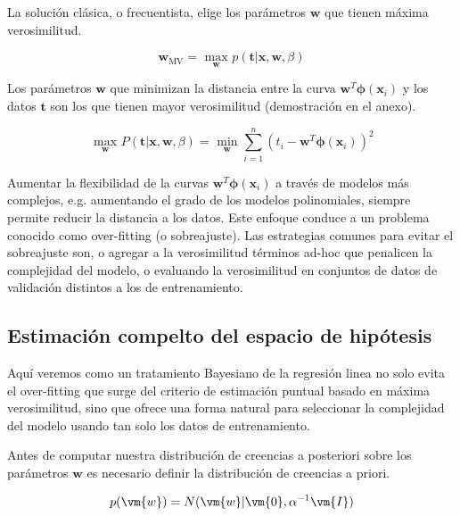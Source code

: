 \documentclass[a4paper,10pt]{article}
\begin{document}
La soluci\'on cl\'asica, o frecuentista, elige los par\'ametros $\bm{w}$ que tienen máxima verosimilitud.

\begin{equation}
 \bm{w}_\text{MV} = \underset{\bm{w}}{\text{ max }} p(\bm{t} | \bm{x}, \bm{w}, \beta)
\end{equation}

Los par\'ametros $\bm{w}$ que minimizan la distancia entre la curva $\bm{w}^T\bm{\phi}(\bm{x}_i)$ y los datos $\bm{t}$ son los que tienen mayor verosimilitud (demostraci\'on en el anexo).

\begin{equation}
 \underset{\bm{w}}{\text{ max }} P(\bm{t} | \bm{x}, \bm{w}, \beta) = \underset{\bm{w}}{\text{ min }} \sum_{i=1}^{n}  (t_i - \bm{w}^T\bm{\phi}(\bm{x}_i))^2 
\end{equation}

Aumentar la flexibilidad de la curvas $\bm{w}^T\bm{\phi}(\bm{x}_i)$ a trav\'es de modelos m\'as complejos, e.g. aumentando el grado de los modelos polinomiales, siempre permite reducir la distancia a los datos.
Este enfoque conduce a un problema conocido como over-fitting (o sobreajuste).
Las estrategias comunes para evitar el sobreajuste son, o agregar a la verosimilitud t\'erminos ad-hoc que penalicen la complejidad del modelo, o evaluando la verosimilitud en conjuntos de datos de validaci\'on distintos a los de entrenamiento.

\subsection{Estimaci\'on compelto del espacio de hipótesis}

Aqu\'i veremos como un tratamiento Bayesiano de la regresi\'on linea no solo evita el over-fitting que surge del criterio de estimaci\'on puntual basado en m\'axima verosimilitud, sino que ofrece una forma natural para seleccionar la complejidad del modelo usando tan solo los datos de entrenamiento.

\vspace{0.3cm}

Antes de computar nuestra distribuci\'on de creencias a posteriori sobre los par\'ametros $\bm{w}$ es necesario definir la distribuci\'on de creencias a priori.

\begin{equation}
 p(\vm{w}) = N(\vm{w}| \vm{0}, \alpha^{-1} \vm{I})
\end{equation}
\end{document}
